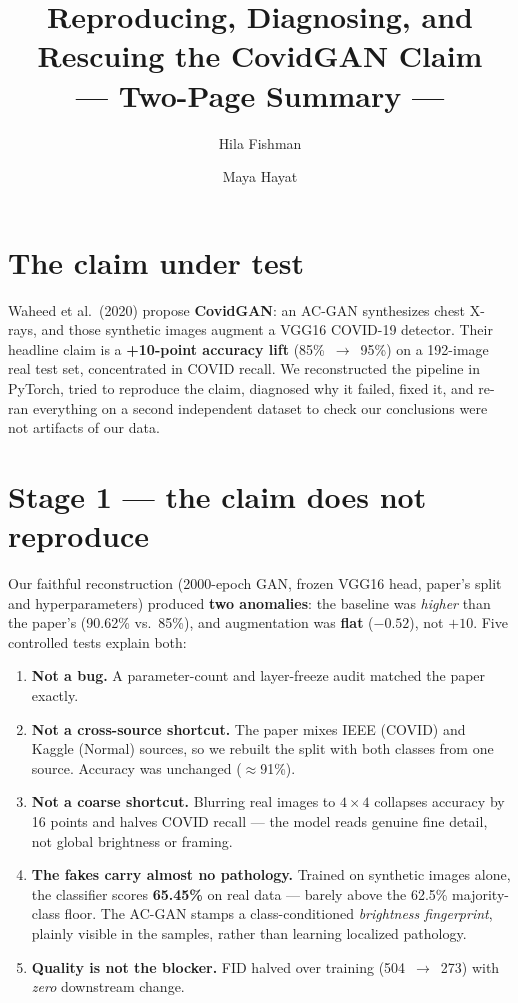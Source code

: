 \documentclass[10pt]{article}
\title{\vspace{-2.2em}\textbf{Reproducing, Diagnosing, and Rescuing the CovidGAN Claim}\\[2pt]
\large --- Two-Page Summary ---}
\author{\normalsize Hila Fishman \and \normalsize Maya Hayat}
\date{}
\begin{document}
\maketitle
\vspace{-3.2em}

\section*{The claim under test}
Waheed et al.\ (2020) propose \textbf{CovidGAN}: an AC-GAN synthesizes chest X-rays, and those synthetic
images augment a VGG16 COVID-19 detector. Their headline claim is a \textbf{+10-point accuracy lift}
(85\%~$\to$~95\%) on a 192-image real test set, concentrated in COVID recall. We reconstructed the pipeline in
PyTorch, tried to reproduce the claim, diagnosed why it failed, fixed it, and re-ran everything on a second
independent dataset to check our conclusions were not artifacts of our data.

\section*{Stage 1 --- the claim does not reproduce}
Our faithful reconstruction (2000-epoch GAN, frozen VGG16 head, paper's split and hyperparameters)
produced \textbf{two anomalies}: the baseline was \emph{higher} than the paper's (90.62\% vs.\ 85\%), and
augmentation was \textbf{flat} ($-0.52$), not $+10$. Five controlled tests explain both:

\begin{enumerate}[nosep,leftmargin=1.4em]
  \item \textbf{Not a bug.} A parameter-count and layer-freeze audit matched the paper exactly.
  \item \textbf{Not a cross-source shortcut.} The paper mixes IEEE (COVID) and Kaggle (Normal) sources, so
        we rebuilt the split with both classes from one source. Accuracy was unchanged ($\approx$91\%).
  \item \textbf{Not a coarse shortcut.} Blurring real images to $4{\times}4$ collapses accuracy by 16 points
        and halves COVID recall --- the model reads genuine fine detail, not global brightness or framing.
  \item \textbf{The fakes carry almost no pathology.} Trained on synthetic images alone, the classifier
        scores \textbf{65.45\%} on real data --- barely above the 62.5\% majority-class floor. The AC-GAN
        stamps a class-conditioned \emph{brightness fingerprint}, plainly visible in the samples, rather
        than learning localized pathology.
  \item \textbf{Quality is not the blocker.} FID halved over training (504~$\to$~273) with \emph{zero}
        downstream change.
\end{enumerate}
\end{document}
